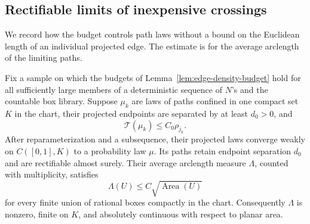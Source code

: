 \subsection{Rectifiable limits of inexpensive crossings}

We record how the budget controls path laws without a bound on the
Euclidean length of an individual projected edge.  The estimate is for
the average arclength of the limiting paths.

\begin{lemma}\label{lem:edge-flow-compactness}
Fix a sample on which the budgets of Lemma~\ref{lem:edge-density-budget}
hold for all sufficiently large members of a deterministic sequence of
\(N\)'s and the countable box library.  Suppose \(\mu_k\) are laws of
paths confined in one compact set \(K\) in the chart, their projected
endpoints are separated by at least \(d_0>0\), and
\begin{equation}\label{eq:cheap-edge-flow}
 \mathcal T(\mu_k)\le C_0\rho_{j_k}.
\end{equation}
After reparameterization and a subsequence, their projected laws converge
weakly on \(C([0,1],K)\) to a probability law \(\mu\).  Its paths retain
endpoint separation \(d_0\) and are rectifiable almost surely.  Their
average arclength measure \(\Lambda\), counted with multiplicity, satisfies
\begin{equation}\label{eq:average-edge-arclength}
 \Lambda(U)\le C\sqrt{\operatorname{Area}(U)}
\end{equation}
for every finite union of rational boxes compactly in the chart.
Consequently \(\Lambda\) is nonzero, finite on \(K\), and absolutely
continuous with respect to planar area.
\end{lemma}

